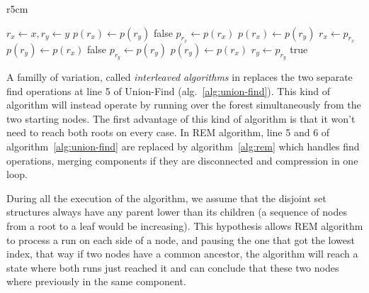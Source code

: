 \documentclass[12px]{article}
\begin{document}
        \setlength\intextsep{0pt}
        \begin{wrapfigure}{r}{5cm}
          \centering
          \begin{minipage}{\linewidth}
            \begin{algorithm}[H]
              \caption{REM algorithm}%
              \label{alg:rem}
              \begin{algorithmic}[1]
                \State $r_x \gets x, r_y \gets y$
                      \State $p(r_x) \gets p(r_y)$
                      \State \Return false
                    \EndIf
                    \State $p_{r_x} \gets p(r_x)$
                    \State $p(r_x) \gets p(r_y)$
                    \State $r_x \gets p_{r_x}$
                  \Else
                      \State $p(r_y) \gets p(r_x)$
                      \State \Return false
                    \EndIf
                    \State $p_{r_y} \gets p(r_y)$
                    \State $p(r_y) \gets p(r_x)$
                    \State $r_y \gets p_{r_y}$
                  \EndIf
                \EndWhile
                \State \Return true
              \end{algorithmic}
            \end{algorithm}
          \end{minipage}
        \end{wrapfigure}

      A familly of variation, called \emph{interleaved algorithms} in  replaces the two separate find operations at line 5 of Union-Find (alg.~\ref{alg:union-find}). This kind of algorithm will instead operate by running over the forest simultaneously from the two starting nodes. The first advantage of this kind of algorithm is that it won't need to reach both roots on every case.
      In REM algorithm, line 5 and 6 of algorithm~\ref{alg:union-find} are replaced by algorithm~\ref{alg:rem} which handles find operations, merging components if they are disconnected and compression in one loop.

      During all the execution of the algorithm, we assume that the disjoint set structures always have any parent lower than its children (a sequence of nodes from a root to a leaf would be increasing).
      This hypothesis allows REM algorithm to process a run on each side of a node, and pausing the one that got the lowest index, that way if two nodes have a common ancestor, the algorithm will reach a state where both runs just reached it and can conclude that these two nodes where previously in the same component.
\end{document}
